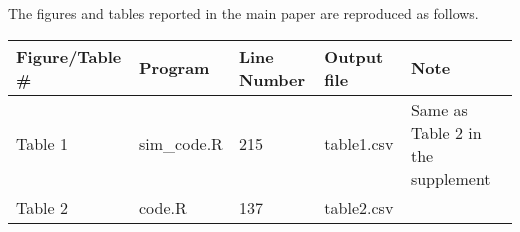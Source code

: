 \documentclass[
]{article}
\begin{document}
The figures and tables reported in the main paper are reproduced as follows.

\begin{longtable}[]{@{}lllll@{}}
\toprule
\begin{minipage}[b]{0.13\columnwidth}\raggedright
Figure/Table \#\strut
\end{minipage} & \begin{minipage}[b]{0.18\columnwidth}\raggedright
Program\strut
\end{minipage} & \begin{minipage}[b]{0.09\columnwidth}\raggedright
Line Number\strut
\end{minipage} & \begin{minipage}[b]{0.23\columnwidth}\raggedright
Output file\strut
\end{minipage} & \begin{minipage}[b]{0.23\columnwidth}\raggedright
Note\strut
\end{minipage}\tabularnewline
\midrule
\endhead
\begin{minipage}[t]{0.13\columnwidth}\raggedright
Table 1\strut
\end{minipage} & \begin{minipage}[t]{0.18\columnwidth}\raggedright
sim\_code.R\strut
\end{minipage} & \begin{minipage}[t]{0.09\columnwidth}\raggedright
215 \strut
\end{minipage} & \begin{minipage}[t]{0.23\columnwidth}\raggedright
table1.csv\strut
\end{minipage} & \begin{minipage}[t]{0.23\columnwidth}\raggedright
Same as Table 2 in the supplement\strut
\end{minipage}\tabularnewline
\begin{minipage}[t]{0.13\columnwidth}\raggedright
Table 2\strut
\end{minipage} & \begin{minipage}[t]{0.18\columnwidth}\raggedright
code.R\strut
\end{minipage} & \begin{minipage}[t]{0.09\columnwidth}\raggedright
137\strut
\end{minipage} & \begin{minipage}[t]{0.23\columnwidth}\raggedright
table2.csv\strut
\end{minipage} & \begin{minipage}[t]{0.23\columnwidth}\raggedright

\end{minipage}
\end{longtable}
\end{document}
